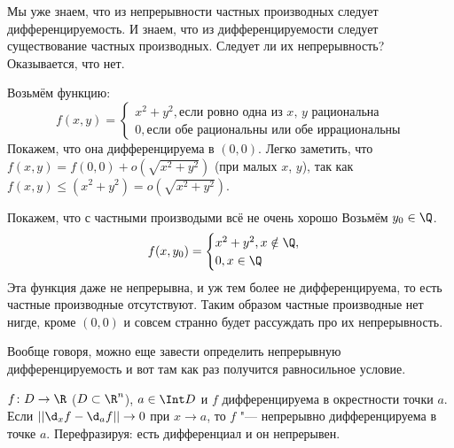 \begin{exmp}
	Мы уже знаем, что из непрерывности частных производных следует дифференцируемость.
	И знаем, что из дифференцируемости следует существование частных производных.
	Следует ли их непрерывность?
	Оказывается, что нет.

	Возьмём функцию:
	\[
	f(x, y) =
		\begin{cases}
			x^2 + y^2, \text{если ровно одна из $x$, $y$ рациональна} \\
			0, \text{если обе рациональны или обе иррациональны}
		\end{cases}
	\]
	Покажем, что она дифференцируема в $(0, 0)$.
	Легко заметить, что $f(x, y) = f(0, 0) + o(\sqrt{x^2+y^2})$ (при малых $x$, $y$),
	так как $f(x, y) \le (x^2 + y^2) = o(\sqrt{x^2+y^2})$.

	Покажем, что с частными производыми всё не очень хорошо
	Возьмём $y_0 \in \Q$.
	\[
		f(x, y_0) =
			\begin{cases}
				x^2 + y^2, x \notin \Q, \\
				0, x \in \Q
			\end{cases}
	\]
	Эта функция даже не непрерывна, и уж тем более не дифференцируема, то есть частные производные отсутствуют.
	Таким образом частные производные нет нигде, кроме $(0, 0)$ и совсем странно будет рассуждать про их непрерывность.
\end{exmp}
\begin{Rem}
	Вообще говоря, можно еще завести определить непрерывную дифференцируемость и вот там как раз получится равносильное условие.
\end{Rem}

\begin{Def}
	$f\colon D \to \R$ ($D \subset \R^n$), $a \in \Int D$ и $f$ дифференцируема в окрестности точки $a$.
	Если $||\d_x f - \d_a f|| \to 0$ при $x \to a$, то $f$ "--- непрерывно дифференцируема в точке $a$.
	Перефразируя: есть дифференциал и он непрерывен.
\end{Def}


